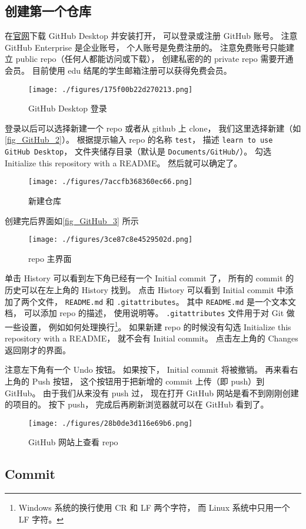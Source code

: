 \subsection{创建第一个仓库}
在\href{https://desktop.github.com/}{官网}下载 GitHub Desktop 并安装打开， 可以登录或注册 GitHub 账号。 注意 GitHub Enterprise 是企业账号， 个人账号是免费注册的。 注意免费账号只能建立 public repo（任何人都能访问或下载）， 创建私密的的 private repo 需要开通会员。 目前使用 edu 结尾的学生邮箱注册可以获得免费会员。

\begin{figure}[ht]
\centering
\texttt{[image: ./figures/175f00b22d270213.png]}
\caption{GitHub Desktop 登录} \label{fig_GitHub_1}
\end{figure}

登录以后可以选择新建一个 repo 或者从 github 上 clone， 我们这里选择新建（如\autoref{fig_GitHub_2}）。 根据提示输入 repo 的名称 \verb|test|， 描述 \verb|learn to use GitHub Desktop|， 文件夹储存目录（默认是 \verb|Documents/GitHub/|）。 勾选 Initialize this repository with a README。 然后就可以确定了。

\begin{figure}[ht]
\centering
\texttt{[image: ./figures/7accfb368360ec66.png]}
\caption{新建仓库} \label{fig_GitHub_2}
\end{figure}

创建完后界面如\autoref{fig_GitHub_3} 所示
\begin{figure}[ht]
\centering
\texttt{[image: ./figures/3ce87c8e4529502d.png]}
\caption{repo 主界面} \label{fig_GitHub_3}
\end{figure}

单击 History 可以看到左下角已经有一个 Initial commit 了， 所有的 commit 的历史可以在左上角的 History 找到。 点击 History 可以看到 Initial commit 中添加了两个文件， \verb|README.md| 和 \verb|.gitattributes|。 其中 \verb|README.md| 是一个文本文档， 可以添加 repo 的描述， 使用说明等。 \verb|.gitattributes| 文件用于对 Git 做一些设置， 例如如何处理换行\footnote{Windows 系统的换行使用 CR 和 LF 两个字符， 而 Linux 系统中只用一个 LF 字符。}。 如果新建 repo 的时候没有勾选 Initialize this repository with a README， 就不会有 Initial commit。 点击左上角的 Changes 返回刚才的界面。

注意左下角有一个 Undo 按钮。 如果按下， Initial commit 将被撤销。 再来看右上角的 Push 按钮， 这个按钮用于把新增的 commit 上传（即 push）到 GitHub。 由于我们从来没有 push 过， 现在打开 GitHub 网站是看不到刚刚创建的项目的。 按下 push， 完成后再刷新浏览器就可以在 GitHub 看到了。
\begin{figure}[ht]
\centering
\texttt{[image: ./figures/28b0de3d116e69b6.png]}
\caption{GitHub 网站上查看 repo} \label{fig_GitHub_5}
\end{figure}

\subsection{Commit}
